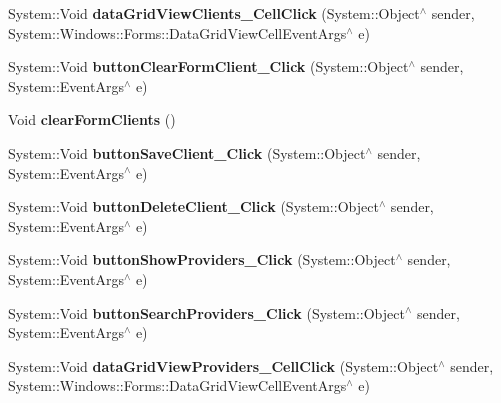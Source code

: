 \begin{DoxyCompactItemize}
\item 
\hypertarget{class_magazyn_1_1_magazin_aefe821059189a7fc8af1e03dd595b503}{}\label{class_magazyn_1_1_magazin_aefe821059189a7fc8af1e03dd595b503} 
System\+::\+Void {\bfseries data\+Grid\+View\+Clients\+\_\+\+Cell\+Click} (System\+::\+Object$^\wedge$ sender, System\+::\+Windows\+::\+Forms\+::\+Data\+Grid\+View\+Cell\+Event\+Args$^\wedge$ e)
\item 
\hypertarget{class_magazyn_1_1_magazin_a8271e54ebbfc0fc18c3e903ce0b47aaa}{}\label{class_magazyn_1_1_magazin_a8271e54ebbfc0fc18c3e903ce0b47aaa} 
System\+::\+Void {\bfseries button\+Clear\+Form\+Client\+\_\+\+Click} (System\+::\+Object$^\wedge$ sender, System\+::\+Event\+Args$^\wedge$ e)
\item 
\hypertarget{class_magazyn_1_1_magazin_ae27a37e927bc66580166fca7cfd00b1c}{}\label{class_magazyn_1_1_magazin_ae27a37e927bc66580166fca7cfd00b1c} 
Void {\bfseries clear\+Form\+Clients} ()
\item 
\hypertarget{class_magazyn_1_1_magazin_a86c5d71826074381ee41a62fce8e4319}{}\label{class_magazyn_1_1_magazin_a86c5d71826074381ee41a62fce8e4319} 
System\+::\+Void {\bfseries button\+Save\+Client\+\_\+\+Click} (System\+::\+Object$^\wedge$ sender, System\+::\+Event\+Args$^\wedge$ e)
\item 
\hypertarget{class_magazyn_1_1_magazin_a98742314d98306613e3ef1ca45216373}{}\label{class_magazyn_1_1_magazin_a98742314d98306613e3ef1ca45216373} 
System\+::\+Void {\bfseries button\+Delete\+Client\+\_\+\+Click} (System\+::\+Object$^\wedge$ sender, System\+::\+Event\+Args$^\wedge$ e)
\item 
\hypertarget{class_magazyn_1_1_magazin_a3ae2fcfc8a09e15089f9b7ed4f7e5e99}{}\label{class_magazyn_1_1_magazin_a3ae2fcfc8a09e15089f9b7ed4f7e5e99} 
System\+::\+Void {\bfseries button\+Show\+Providers\+\_\+\+Click} (System\+::\+Object$^\wedge$ sender, System\+::\+Event\+Args$^\wedge$ e)
\item 
\hypertarget{class_magazyn_1_1_magazin_a9c121ceaa80423f04e40ff553350f845}{}\label{class_magazyn_1_1_magazin_a9c121ceaa80423f04e40ff553350f845} 
System\+::\+Void {\bfseries button\+Search\+Providers\+\_\+\+Click} (System\+::\+Object$^\wedge$ sender, System\+::\+Event\+Args$^\wedge$ e)
\item 
\hypertarget{class_magazyn_1_1_magazin_adf2683e579e6cd3cfe68f47530928e87}{}\label{class_magazyn_1_1_magazin_adf2683e579e6cd3cfe68f47530928e87} 
System\+::\+Void {\bfseries data\+Grid\+View\+Providers\+\_\+\+Cell\+Click} (System\+::\+Object$^\wedge$ sender, System\+::\+Windows\+::\+Forms\+::\+Data\+Grid\+View\+Cell\+Event\+Args$^\wedge$ e)

\end{DoxyCompactItemize}
